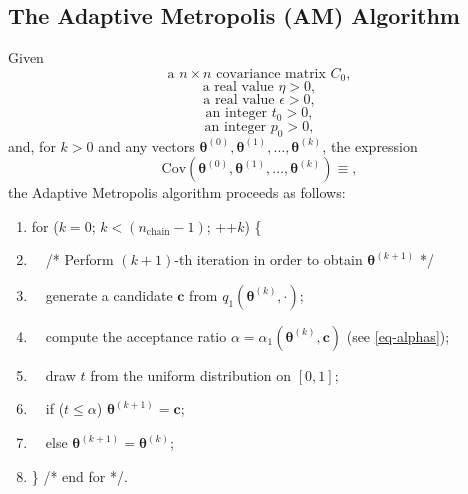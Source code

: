\subsection{The Adaptive Metropolis (AM) Algorithm}\label{subsc-rmc-am-alg}
Given
\begin{equation}\label{eq-C0}
\text{a }n\times n\text{ covariance matrix }C_0,
\end{equation}
\begin{equation}\label{eq-eta}
\text{a real value }\eta >0,
\end{equation}
\begin{equation}\label{eq-epsilon}
\text{a real value }\epsilon>0,
\end{equation}
\begin{equation}\label{eq-t0}
\text{an integer }t_0>0,
\end{equation}
\begin{equation}\label{eq-p0}
\text{an integer }p_0>0,
\end{equation}
and, for $k > 0$ and any vectors $\boldsymbol{\theta}^{(0)},\boldsymbol{\theta}^{(1)},\ldots,\boldsymbol{\theta}^{(k)}$, the expression
\begin{equation}\label{eq-emperical-cov}
\text{Cov}(\boldsymbol{\theta}^{(0)},\boldsymbol{\theta}^{(1)},\ldots,\boldsymbol{\theta}^{(k)})\equiv,
\end{equation}
the Adaptive Metropolis algorithm proceeds as follows:
\begin{enumerate}
\item for ($k=0$; $k < (n_{\text{chain}}-1)$; ++$k$) \{
\item $\quad$/* Perform $(k+1)$-th iteration in order to obtain $\boldsymbol{\theta}^{(k+1)}$ */
\item $\quad$generate a candidate $\mathbf{c}$ from $q_1(\boldsymbol{\theta}^{(k)},\cdot)$;
\item $\quad$compute the acceptance ratio $\alpha=\alpha_1(\boldsymbol{\theta}^{(k)},\mathbf{c})$ (see \eqref{eq-alphas});
\item $\quad$draw $t$ from the uniform distribution on $[0,1]$;
\item $\quad$if ($t\leqslant \alpha$) $\boldsymbol{\theta}^{(k+1)}=\mathbf{c}$;
\item $\quad$else $\boldsymbol{\theta}^{(k+1)}=\boldsymbol{\theta}^{(k)}$;
\item \} /* end for */.
\end{enumerate}


